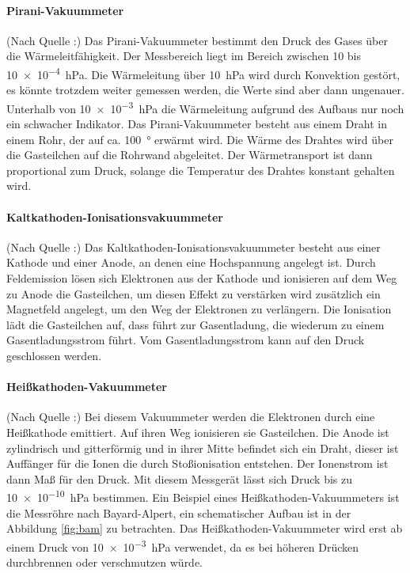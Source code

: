 \paragraph{Pirani-Vakuummeter }(Nach Quelle \cite{pfeiffer:mg}:)
Das Pirani-Vakuummeter bestimmt den Druck des Gases über die Wärmeleitfähigkeit. Der Messbereich
liegt im Bereich zwischen 10 bis \SI{10e-4}{\hecto\pascal}. Die Wärmeleitung 
über \SI{10}{\hecto\pascal} wird durch Konvektion gestört, es könnte trotzdem weiter gemessen 
werden, die Werte sind aber dann ungenauer. Unterhalb von \SI{10e-3}{\hecto\pascal} die Wärmeleitung
aufgrund des Aufbaus nur noch ein schwacher Indikator. Das Pirani-Vakuummeter besteht aus einem
Draht in einem Rohr, der auf ca. \SI{100}{\degree} erwärmt wird. Die Wärme des Drahtes wird über
die Gasteilchen auf die Rohrwand abgeleitet. Der Wärmetransport ist dann proportional zum Druck,
solange die Temperatur des Drahtes konstant gehalten wird.

\paragraph{Kaltkathoden-Ionisationsvakuummeter }(Nach Quelle \cite{pfeiffer:mg}:)
Das Kaltkathoden-Ionisationsvakuummeter besteht aus einer Kathode und einer Anode, an denen eine
Hochspannung angelegt ist. Durch Feldemission lösen sich Elektronen aus der Kathode und ionisieren
auf dem Weg zu Anode die Gasteilchen, um diesen Effekt zu verstärken wird zusätzlich ein
Magnetfeld angelegt, um den Weg der Elektronen zu verlängern. Die Ionisation lädt die Gasteilchen 
auf, dass führt zur Gasentladung, die wiederum zu einem Gasentladungsstrom führt. 
Vom Gasentladungsstrom kann auf den Druck geschlossen werden.

\paragraph{Heißkathoden-Vakuummeter }(Nach Quelle \cite{pfeiffer:mg}:)
Bei diesem Vakuummeter werden die Elektronen durch eine Heißkathode emittiert. Auf ihren Weg
ionisieren sie Gasteilchen. Die Anode ist zylindrisch und gitterförmig und in ihrer Mitte befindet
sich ein Draht, dieser ist Auffänger für die Ionen die durch Stoßionisation entstehen. Der
Ionenstrom ist dann Maß für den Druck. Mit diesem Messgerät lässt sich Druck bis zu
\SI{10e-10}{\hecto\pascal} bestimmen. Ein Beispiel eines Heißkathoden-Vakuummeters ist die
Messröhre nach Bayard-Alpert, ein schematischer Aufbau ist in der Abbildung \ref{fig:bam} zu
betrachten.
\newline
Das Heißkathoden-Vakuummeter wird erst ab
einem Druck von \SI{10e-3}{\hecto\pascal} verwendet, da es bei höheren Drücken durchbrennen oder
verschmutzen würde.

